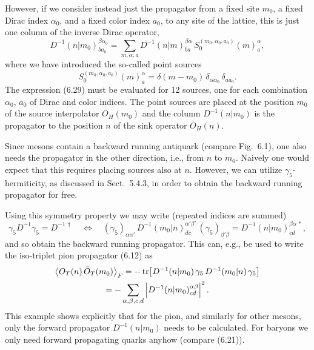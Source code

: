 However, if we consider instead just the propagator from a fixed site $m_0$, a
fixed Dirac index $\alpha_0$, and a fixed color index $a_0$, to any site of the
lattice, this is just one column of the inverse Dirac operator,
\begin{equation}
  D^{-1}(n|m_0)^{\beta\alpha_0}_{b a_0}
  = \sum_{m,\alpha,a} D^{-1}(n|m)^{\beta\alpha}_{ba}\,
    S_0^{(m_0,\alpha_0,a_0)}(m)^{\alpha}_{a} ,
\end{equation}
where we have introduced the so-called point sources
\begin{equation}
  S_0^{(m_0,\alpha_0,a_0)}(m)^{\alpha}_{a}
  = \delta(m - m_0)\, \delta_{\alpha\alpha_0}\, \delta_{aa_0} .
\end{equation}
The expression (6.29) must be evaluated for 12 sources, one for each
combination $\alpha_0$, $a_0$ of Dirac and color indices. The point sources are
placed at the position $m_0$ of the source interpolator $O_H(m_0)$ and the
column $D^{-1}(n|m_0)$ is the propagator to the position $n$ of the sink
operator $\bar{O}_H(n)$.

Since mesons contain a backward running antiquark (compare Fig.~6.1), one also
needs the propagator in the other direction, i.e., from $n$ to $m_0$. Naively
one would expect that this requires placing sources also at $n$. However, we
can utilize $\gamma_5$-hermiticity, as discussed in Sect.~5.4.3, in order to
obtain the backward running propagator for free.

Using this symmetry property we may write (repeated indices are summed)
\begin{equation}
  \gamma_5 D^{-1} \gamma_5 = D^{-1\,\dagger}
  \quad\Longleftrightarrow\quad
  (\gamma_5)_{\alpha\alpha'}\, D^{-1}(m_0|n)^{\alpha'\beta'}_{dc}\,
  (\gamma_5)_{\beta'\beta} = D^{-1}(n|m_0)^{\beta\alpha\,*}_{cd} ,
\end{equation}
and so obtain the backward running propagator. This can, e.g., be used to write
the iso-triplet pion propagator (6.12) as
\begin{multline}
  \big\langle O_T(n)\, \bar{O}_T(m_0) \big\rangle_F
  = -\operatorname{tr}\!\left[ D^{-1}(n|m_0)\, \gamma_5\, D^{-1}(m_0|n)\, \gamma_5 \right] \\
  = -\sum_{\alpha,\beta,c,d} \left| D^{-1}(n|m_0)^{\alpha\beta}_{cd}
    \right|^2 .
\end{multline}
This example shows explicitly that for the pion, and similarly for other
mesons, only the forward propagator $D^{-1}(n|m_0)$ needs to be calculated. For
baryons we only need forward propagating quarks anyhow (compare (6.21)).

